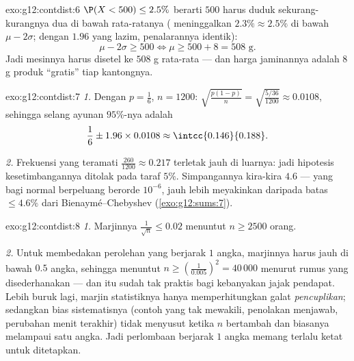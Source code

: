 \begin{solution}{exo:g12:contdist:6}
$\P(X < 500) \leq 2.5\%$ berarti $500$ harus duduk sekurang-kurangnya dua  di bawah rata-ratanya ( meninggalkan $2.3\% \approx 2.5\%$ di bawah
$\mu - 2\sigma$; dengan $1.96$ yang lazim, penalarannya identik):
\[
\mu - 2\sigma \geq 500 \iff \mu \geq 500 + 8 = 508 \text{ g}.
\]
Jadi mesinnya harus disetel ke $508$ g rata-rata --- dan harga
jaminannya adalah $8$ g produk ``gratis'' tiap kantongnya.
\end{solution}

\begin{solution}{exo:g12:contdist:7}
\emph{1.} Dengan $p = \frac16$, $n = 1200$:
$\sqrt{\frac{p(1-p)}{n}} = \sqrt{\frac{5/36}{1200}} \approx 0.0108$, sehingga
selang ayunan $95\%$-nya adalah
\[
\frac16 \pm 1.96 \times 0.0108 \approx \intcc{0.146}{0.188}.
\]

\emph{2.} Frekuensi yang teramati $\frac{260}{1200} \approx 0.217$ terletak jauh
di luarnya: jadi hipotesis kesetimbangannya ditolak pada taraf $5\%$.
Simpangannya kira-kira $4.6$  --- yang bagi 
normal berpeluang berorde $10^{-6}$, jauh lebih meyakinkan daripada
batas $\leq 4.6\%$ dari Bienaymé--Chebyshev
(\cref{exo:g12:sums:7}).
\end{solution}

\begin{solution}{exo:g12:contdist:8}
\emph{1.} Marjinnya $\frac{1}{\sqrt n} \leq 0.02$ menuntut
$n \geq 2500$ orang.

\emph{2.} Untuk membedakan perolehan yang berjarak $1$ angka, marjinnya harus jauh
di bawah $0.5$ angka, sehingga menuntut $n \geq \left(\frac{1}{0.005}\right)^2 =
40\,000$ menurut rumus yang disederhanakan --- dan itu sudah tak praktis bagi kebanyakan jajak pendapat.
Lebih buruk lagi, marjin statistiknya hanya memperhitungkan galat \emph{pencuplikan};
sedangkan bias sistematisnya (contoh yang tak mewakili, penolakan menjawab, perubahan
menit terakhir) tidak menyusut ketika $n$ bertambah dan biasanya melampaui satu angka. Jadi
perlombaan berjarak $1$ angka memang terlalu ketat untuk ditetapkan.
\end{solution}

